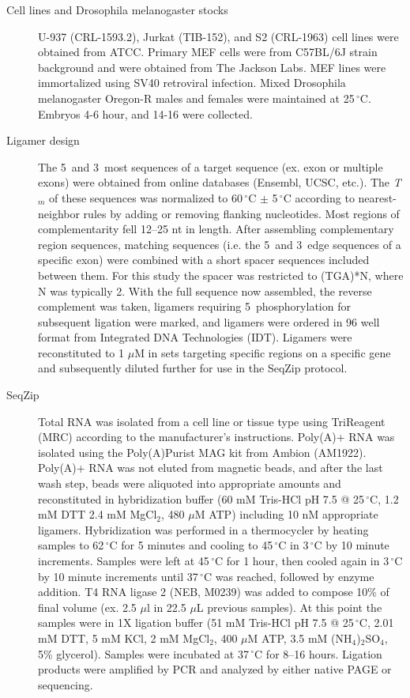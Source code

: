   \begin{description}
  	\item[Cell lines and Drosophila melanogaster stocks] \hfill 
		
		U-937 (CRL-1593.2), Jurkat (TIB-152), and S2 (CRL-1963) cell lines were obtained from ATCC. Primary MEF cells were from C57BL/6J strain background and were obtained from The Jackson Labs. MEF lines were immortalized using SV40 retroviral infection. Mixed Drosophila melanogaster Oregon-R males and females were maintained at 25$\,^{\circ}\mathrm{C}$. Embryos 4-6 hour, and 14-16 were collected. 

		\item[Ligamer design] 
		The 5\textprime~and 3\textprime~most sequences of a target sequence (ex. exon or multiple exons) were obtained from online databases (Ensembl, UCSC, etc.). The \textit{T}$_{m}$ of these sequences was normalized to 60$\,^{\circ}\mathrm{C}$ $\pm$ 5$\,^{\circ}\mathrm{C}$ according to nearest-neighbor rules \citep{Xia1998} by adding or removing flanking nucleotides. Most regions of complementarity fell 12--25 nt in length. After assembling complementary region sequences, matching sequences (i.e. the 5\textprime~and 3\textprime~edge sequences of a specific exon) were combined with a short spacer sequences included between them. For this study the spacer was restricted to (TGA)*N, where N was typically 2. With the full sequence now assembled, the reverse complement was taken, ligamers requiring 5\textprime~phosphorylation for subsequent ligation were marked, and ligamers were ordered in 96 well format from Integrated DNA Technologies (IDT). Ligamers were reconstituted to 1 $\mu$M in sets targeting specific regions on a specific gene and subsequently diluted further for use in the SeqZip protocol.

		\item[SeqZip] 
		Total RNA was isolated from a cell line or tissue type using TriReagent (MRC) according to the manufacturer's instructions. Poly(A)+ RNA was isolated using the Poly(A)Purist MAG kit from Ambion (AM1922). Poly(A)+ RNA was not eluted from magnetic beads, and after the last wash step, beads were aliquoted into appropriate amounts and reconstituted in hybridization buffer (60 mM Tris-HCl pH 7.5 @ 25$\,^{\circ}\mathrm{C}$, 1.2 mM DTT 2.4 mM MgCl$_{2}$, 480 $\mu$M ATP) including 10 nM appropriate ligamers. Hybridization was performed in a thermocycler by heating samples to 62$\,^{\circ}\mathrm{C}$ for 5 minutes and cooling to 45$\,^{\circ}\mathrm{C}$ in 3$\,^{\circ}\mathrm{C}$ by 10 minute increments. Samples were left at 45$\,^{\circ}\mathrm{C}$ for 1 hour, then cooled again in 3$\,^{\circ}\mathrm{C}$ by 10 minute increments until 37$\,^{\circ}\mathrm{C}$ was reached, followed by enzyme addition. T4 RNA ligase 2 (NEB, M0239) was added to compose 10\% of final volume (ex. 2.5 $\mu$l in 22.5 $\mu$L previous samples). At this point the samples were in 1X ligation buffer (51 mM Tris-HCl pH 7.5 @ 25$\,^{\circ}\mathrm{C}$, 2.01 mM DTT, 5 mM KCl, 2 mM MgCl$_{2}$, 400 $\mu$M ATP, 3.5 mM (NH$_{4}$)$_{2}$SO$_{4}$, 5\% glycerol). Samples were incubated at 37$\,^{\circ}\mathrm{C}$ for 8--16 hours. Ligation products were amplified by PCR and analyzed by either native PAGE or sequencing.


\end{description}
